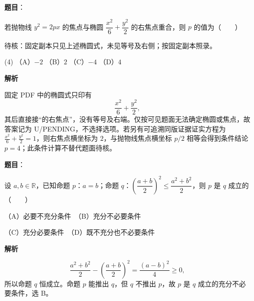 \begin{answer}

\textbf{题目}：

若抛物线 $y^2=2px$ 的焦点与椭圆 $\dfrac{x^2}{6}+\dfrac{y^2}{2}$ 的右焦点重合，则 $p$ 的值为\mbox{（　　）}

\begin{gktip}
待核：固定副本只见上述椭圆式，未见等号及右侧；按固定副本照录。
\end{gktip}

\begin{gkopts}(4)
\task （A）$-2$
\task （B）$2$
\task （C）$-4$
\task （D）$4$
\end{gkopts}

\textbf{解析}

固定 PDF 中的椭圆式只印有
\nopagebreak[4]
\[
\frac{x^2}{6}+\frac{y^2}{2},
\]
其后直接接“的右焦点”，没有等号及右端。仅按可见题面无法确定椭圆或焦点，故答案记为 U/PENDING，不选择选项。若另有可追溯同版证据证实方程为 $\frac{x^2}{6}+\frac{y^2}{2}=1$，则右焦点横坐标为 $2$，与抛物线焦点横坐标 $p/2$ 相等会得到条件结论 $p=4$；此条件计算不替代题面待核。


\end{answer}
\begin{answer}

\textbf{题目}：

设 $a,b\in\mathbb R$，已知命题 $p\text{：}a=b$；命题 $q\text{：}\left(\dfrac{a+b}{2}\right)^2\leqslant\dfrac{a^2+b^2}{2}$，则 $p$ 是 $q$ 成立的\mbox{（　　）}

（A）必要不充分条件　（B）充分不必要条件

（C）充分必要条件　（D）既不充分也不必要条件

\textbf{解析}

\nopagebreak[4]
\[
\frac{a^2+b^2}{2}-\left(\frac{a+b}{2}\right)^2
=\frac{(a-b)^2}{4}\ge0,
\]
所以命题 $q$ 恒成立。命题 $p$ 能推出 $q$，但 $q$ 不推出 $p$，故 $p$ 是 $q$ 成立的充分不必要条件，选 B。


\end{answer}
